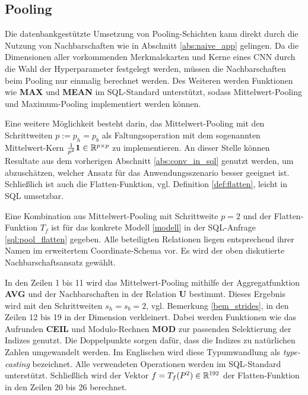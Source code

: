 

\subsection*{Pooling}
Die datenbankgestützte Umsetzung von Pooling-Schichten kann direkt durch die Nutzung von Nachbarschaften wie in Abschnitt \ref{abs:naive_app} gelingen. Da die Dimensionen aller vorkommenden Merkmalskarten und Kerne eines CNN durch die Wahl der Hyperparameter festgelegt werden, müssen die Nachbarschaften beim Pooling nur einmalig berechnet werden. Des Weiteren werden Funktionen wie \textbf{MAX} und \textbf{MEAN} im SQL-Standard unterstützt, sodass Mittelwert-Pooling und Maximum-Pooling implementiert werden können.

Eine weitere Möglichkeit besteht darin, das Mittelwert-Pooling mit den Schrittweiten $p:=p_h=p_b$ als Faltungsoperation mit dem sogenannten Mittelwert-Kern $\frac{1}{p^2} \mathbf{1} \in \mathbb{R}^{p \times p}$ zu implementieren. An dieser Stelle können Resultate aus dem vorherigen Abschnitt \ref{abs:conv_in_sql} genutzt werden, um abzuschätzen, welcher Ansatz für das Anwendungsszenario besser geeignet ist. Schließlich ist auch die Flatten-Funktion, vgl. Definition \ref{def:flatten}, leicht in SQL umsetzbar. 

Eine Kombination aus Mittelwert-Pooling mit Schrittweite $p=2$ und der Flatten-Funktion $T_f$ ist für das konkrete Modell \ref{modell} in der SQL-Anfrage \ref{sql:pool_flatten} gegeben. Alle beteiligten Relationen liegen entsprechend ihrer Namen im erweitertem Coordinate-Schema vor. Es wird der oben diskutierte Nachbarschaftsansatz gewählt.



In den Zeilen 1 bis 11 wird das Mittelwert-Pooling mithilfe der Aggregatfunktion \textbf{AVG} und der Nachbarschaften in der Relation \textbf{U} bestimmt. Dieses Ergebnis wird mit den Schrittweiten $s_h=s_b=2$, vgl. Bemerkung \ref{bem_strides}, in den Zeilen 12 bis 19 in der Dimension verkleinert. Dabei werden Funktionen wie das Aufrunden \textbf{CEIL} und Modulo-Rechnen \textbf{MOD} zur passenden Selektierung der Indizes genutzt. Die Doppelpunkte sorgen dafür, dass die Indizes zu natürlichen Zahlen umgewandelt werden. Im Englischen wird diese Typumwandlung als \textit{type-casting} bezeichnet. Alle verwendeten Operationen werden im SQL-Standard unterstützt. Schließlich wird der Vektor $f=T_f(P^2) \in \mathbb{R}^{192}$ der Flatten-Funktion in den Zeilen 20 bis 26 berechnet. 
 
